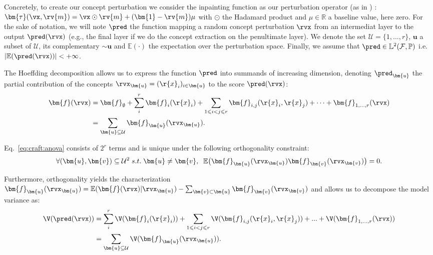 Concretely, to create our concept perturbation we consider the inpainting function as our perturbation operator (as in \cite{ribeiro2016lime, petsiuk2018rise, fel2021sobol}) : $\bm{\tau}(\vx, \rv{m}) = \vx \odot \rv{m} + (\bm{1} - \rv{m}) \mu$ with $\odot$ the Hadamard product and $\mu \in \mathbb{R}$ a baseline value, here zero.
For the sake of notation, we will note $\pred$ the function mapping a random concept perturbation $\rvx$ from an intermediat layer to the output $\pred(\rvx)$ (e.g., the final layer if we do the concept extraction on the penultimate layer).
We denote the set $\mathcal{U} = \{1, ..., r\}$, $\bm{u}$ a subset of $\mathcal{U}$, its complementary $\sim \bm{u}$ and $\mathbb{E}(\cdot)$ the expectation over the perturbation space.
Finally, we assume that $\pred \in \mathbb{L}^2(\mathcal{F}, \mathbb{P})$ i.e. $|\mathbb{E}(\pred(\rvx))| < + \infty$.

The Hoeffding decomposition allows us to express the function $\pred$ into summands of increasing dimension, denoting $\pred_{\bm{u}}$ the partial contribution of the concepts $\rvx_{\bm{u}} = (\r{x}_i)_{i\in \bm{u}}$ to the score $\pred(\rvx)$:
\begin{equation}
    \label{eq:craft:anova}
    \begin{aligned}
    \bm{f}(\rvx) &= \bm{f}_{\emptyset}
     + \sum_i^r \bm{f}_i(\r{x}_i)
     + \sum_{1 \leqslant i < j \leqslant r} \bm{f}_{i,j}(\r{x}_i, \r{x}_j)
     + \cdots 
     + \bm{f}_{1,...,r}(\rvx) \\
    &= \sum_{\substack{\bm{u} \subseteq \mathcal{U}}} \bm{f}_{\bm{u}}(\rvx_{\bm{u}}).
    \end{aligned}
\end{equation}

Eq.~\ref{eq:craft:anova} consists of $2^r$ terms and is unique under the following orthogonality constraint:
\begin{equation}
    \label{eq:craft:anova_ortho}
    \begin{aligned}
    \forall (\bm{u},\bm{v}) \subseteq \mathcal{U}^2 \; s.t. \;  \bm{u} \neq \bm{v}, \;\; \mathbb{E}\big(\bm{f}_{\bm{u}}(\rvx_{\bm{u}}) \bm{f}_{\bm{v}}(\rvx_{\bm{v}})\big) = 0.
    \end{aligned}
\end{equation}

Furthermore, orthogonality yields the characterization $\bm{f}_{\bm{u}}(\rvx_{\bm{u}}) = \mathbb{E}(\bm{f}(\rvx)|\rvx_{\bm{u}}) - \sum_{\bm{v}\subset \bm{u}}\bm{f}_{\bm{v}}(\rvx_{\bm{v}})$ and allows us to decompose the model variance as:
\begin{equation}
    \label{eq:craft:var_decomposition}
    \begin{aligned}
        \V(\pred(\rvx)) &= \sum_i^r \V(\bm{f}_i(\r{x}_i)) 
        +\sum_{1 \leqslant i < j \leqslant r} \V(\bm{f}_{i,j}(\r{x}_i, \r{x}_j))
        + ... + \V(\bm{f}_{1,...,r}(\rvx)) \\
        &=\sum_{\substack{\bm{u} \subseteq \mathcal{U}}} \V(\bm{f}_{\bm{u}}(\rvx_{\bm{u}})).
        \end{aligned}
\end{equation}

